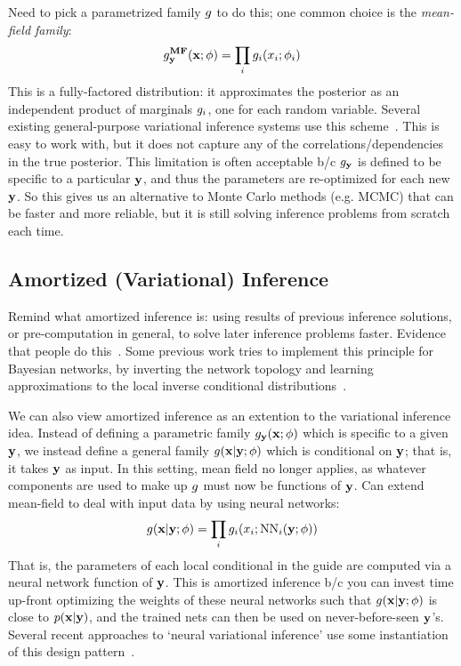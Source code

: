 Need to pick a parametrized family $g$ to do this; one common choice is the \emph{mean-field family}:
\begin{equation*}
g^{\textbf{MF}}_{\mathbf{y}}(\mathbf{x} ; \phi) = \prod_i g_i(x_i ; \phi_i)
\end{equation*}
This is a fully-factored distribution: it approximates the posterior as an independent product of marginals $g_i$, one for each random variable.
Several existing general-purpose variational inference systems use this scheme~\cite{AVIPP,BBVI}.
This is easy to work with, but it does not capture any of the correlations/dependencies in the true posterior.
This limitation is often acceptable b/c $g_{\mathbf{y}}$ is defined to be specific to a particular $\mathbf{y}$, and thus the parameters are re-optimized for each new $\mathbf{y}$.
So this gives us an alternative to Monte Carlo methods (e.g. MCMC) that can be faster and more reliable, but it is still solving inference problems from scratch each time.

\subsection{Amortized (Variational) Inference}

Remind what amortized inference is: using results of previous inference solutions, or pre-computation in general, to solve later inference problems faster.
Evidence that people do this~\cite{AmortizedInference}.
Some previous work tries to implement this principle for Bayesian networks, by inverting the network topology and learning approximations to the local inverse conditional distributions~\cite{StochasticInverses,NeuralStochasticInverses}.

We can also view amortized inference as an extention to the variational inference idea.
Instead of defining a parametric family $g_{\mathbf{y}}(\mathbf{x} ; \phi)$ which is specific to a given $\mathbf{y}$, we instead define a general family $g(\mathbf{x} | \mathbf{y} ; \phi)$ which is conditional on $\mathbf{y}$; that is, it takes $\mathbf{y}$ as input.
In this setting, mean field no longer applies, as whatever components are used to make up $g$ must now be functions of $\mathbf{y}$.
Can extend mean-field to deal with input data by using neural networks:
\begin{equation*}
g(\mathbf{x} | \mathbf{y} ; \phi) = \prod_i g_i(x_i ; \text{NN}_i(\mathbf{y} ; \phi))
\end{equation*}
That is, the parameters of each local conditional in the guide are computed via a neural network function of $\mathbf{y}$.
This is amortized inference b/c you can invest time up-front optimizing the weights of these neural networks such that $g(\mathbf{x} | \mathbf{y} ; \phi)$ is close to $p(\mathbf{x} | \mathbf{y})$, and the trained nets can then be used on never-before-seen $\mathbf{y}$'s.
Several recent approaches to `neural variational inference' use some instantiation of this design pattern~\cite{NVIL,DLGM,AEVB}.

